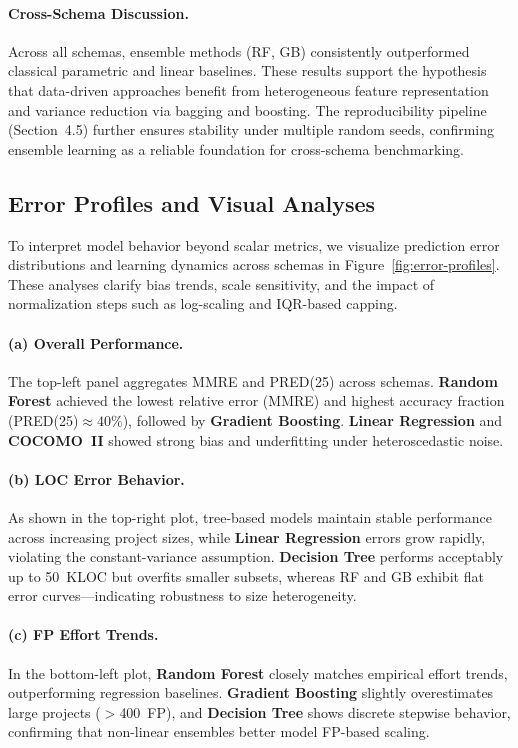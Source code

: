 \documentclass[11pt,a4paper]{article}
\begin{document}
\paragraph{Cross-Schema Discussion.}
Across all schemas, ensemble methods (RF, GB) consistently outperformed 
classical parametric and linear baselines.  
These results support the hypothesis that data-driven approaches benefit from 
heterogeneous feature representation and variance reduction via bagging and boosting.  
The reproducibility pipeline (Section~4.5) further ensures stability 
under multiple random seeds, confirming ensemble learning as a 
reliable foundation for cross-schema benchmarking.



\subsection{Error Profiles and Visual Analyses}


To interpret model behavior beyond scalar metrics, 
we visualize prediction error distributions and learning dynamics 
across schemas in Figure~\ref{fig:error-profiles}.  
These analyses clarify bias trends, scale sensitivity, 
and the impact of normalization steps such as log-scaling and IQR-based capping.

\paragraph{(a) Overall Performance.}
The top-left panel aggregates MMRE and PRED(25) across schemas.  
\textbf{Random Forest} achieved the lowest relative error (MMRE) 
and highest accuracy fraction (PRED(25)$\approx40\%$), 
followed by \textbf{Gradient Boosting}.  
\textbf{Linear Regression} and \textbf{COCOMO~II} showed 
strong bias and underfitting under heteroscedastic noise.

\paragraph{(b) LOC Error Behavior.}
As shown in the top-right plot, tree-based models maintain 
stable performance across increasing project sizes, 
while \textbf{Linear Regression} errors grow rapidly, 
violating the constant-variance assumption.  
\textbf{Decision Tree} performs acceptably up to 50~KLOC 
but overfits smaller subsets, whereas RF and GB exhibit 
flat error curves—indicating robustness to size heterogeneity.

\paragraph{(c) FP Effort Trends.}
In the bottom-left plot, \textbf{Random Forest} closely matches 
empirical effort trends, outperforming regression baselines.  
\textbf{Gradient Boosting} slightly overestimates large projects ($>$400~FP), 
and \textbf{Decision Tree} shows discrete stepwise behavior, 
confirming that non-linear ensembles better model FP-based scaling.
\end{document}
